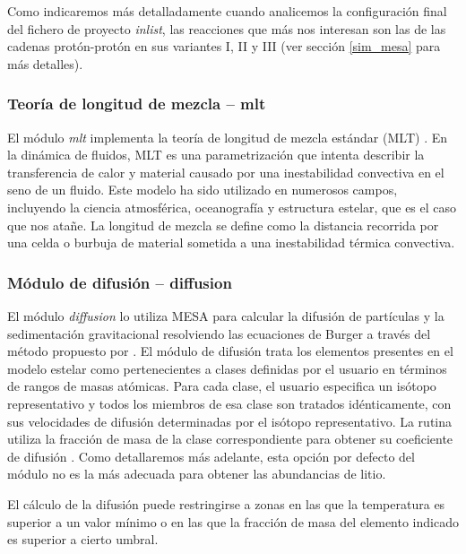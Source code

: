 Como indicaremos más detalladamente cuando analicemos la configuración final del fichero de proyecto \textit{inlist}, las reacciones que más nos interesan son las de las cadenas protón-protón en sus variantes I, II y III (ver sección \ref{sim_mesa} para más detalles).\par

\subsubsection{Teoría de longitud de mezcla – mlt}
El módulo \textit{mlt} implementa la teoría de longitud de mezcla estándar (MLT) \citep{Paxton2011}. En la dinámica de fluidos, MLT es una parametrización que intenta describir la transferencia de calor y material causado por una inestabilidad convectiva en el seno de un fluido. Este modelo ha sido utilizado en numerosos campos, incluyendo la ciencia atmosférica, oceanografía y estructura estelar, que es el caso que nos atañe. La longitud de mezcla se define como la distancia recorrida por una celda o burbuja de material sometida a una inestabilidad térmica convectiva.\par

\subsubsection{Módulo de difusión – diffusion} \label{subsec_diffusion}
El módulo \textit{diffusion} lo utiliza MESA para calcular la difusión de partículas y la sedimentación gravitacional resolviendo las ecuaciones de Burger \citep{Burgers1969} a través del método propuesto por \cite{Thoul1993}. El módulo de difusión trata los elementos presentes en el modelo estelar como pertenecientes a clases definidas por el usuario en términos de rangos de masas atómicas. Para cada clase, el usuario especifica un isótopo representativo y todos los miembros de esa clase son tratados idénticamente, con sus velocidades de difusión determinadas por el isótopo representativo. La rutina utiliza la fracción de masa de la clase correspondiente para obtener su coeficiente de difusión \citep{Paxton2015}. Como detallaremos más adelante, esta opción por defecto del módulo no es la más adecuada para obtener las abundancias de litio.\par

El cálculo de la difusión puede restringirse a zonas en las que la temperatura es superior a un valor mínimo o en las que la fracción de masa del elemento indicado es superior a cierto umbral.\par

